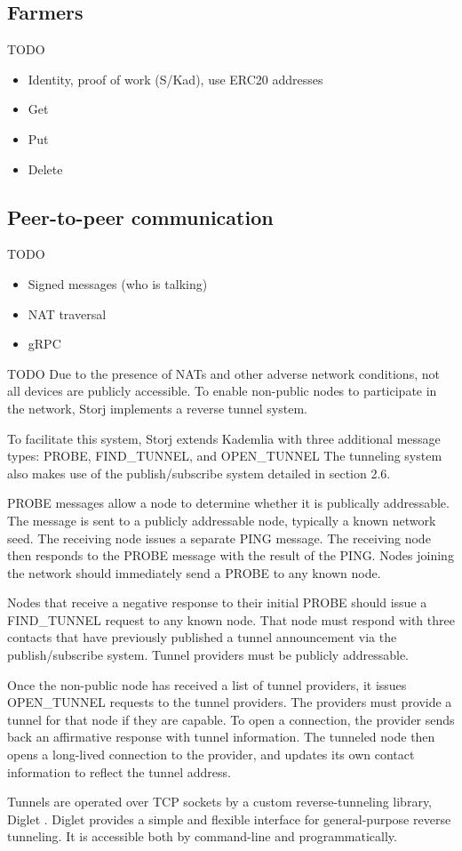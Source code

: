 \documentclass[a4paper,10pt]{article}
\newcommand{\todo}[1]{{\color{red} TODO #1}}
\begin{document}
\subsection{Farmers}

\todo{}

\begin{itemize}
\item Identity, proof of work (S/Kad), use ERC20 addresses
\item Get
\item Put
\item Delete
\end{itemize}

\subsection{Peer-to-peer communication}

\todo{}

\begin{itemize}
\item Signed messages (who is talking)
\item NAT traversal
\item gRPC
\end{itemize}

\todo{
Due to the presence of NATs and other adverse network conditions, not all
devices are publicly accessible. To enable non-public nodes to participate in
the network, Storj implements a reverse tunnel system.

To facilitate this system, Storj extends Kademlia with three additional message
types: PROBE, FIND\_TUNNEL, and OPEN\_TUNNEL The tunneling system also makes use
of the publish/subscribe system detailed in section 2.6.

PROBE messages allow a node to determine whether it is publically addressable.
The message is sent to a publicly addressable node, typically a known network
seed. The receiving node issues a separate PING message. The receiving node then
responds to the PROBE message with the result of the PING. Nodes joining the
network should immediately send a PROBE to any known node.

Nodes that receive a negative response to their initial PROBE should issue a
FIND\_TUNNEL request to any known node. That node must respond with three
contacts that have previously published a tunnel announcement via the
publish/subscribe system. Tunnel providers must be publicly addressable.

Once the non-public node has received a list of tunnel providers, it issues
OPEN\_TUNNEL requests to the tunnel providers. The providers must provide a
tunnel for that node if they are capable. To open a connection, the provider
sends back an affirmative response with tunnel information. The tunneled node
then opens a long-lived connection to the provider, and updates its own contact
information to reflect the tunnel address.

Tunnels are operated over TCP sockets by a custom reverse-tunneling library,
Diglet \cite{14}. Diglet provides a simple and flexible interface for
general-purpose reverse tunneling. It is accessible both by command-line and
programmatically.
}
\end{document}
